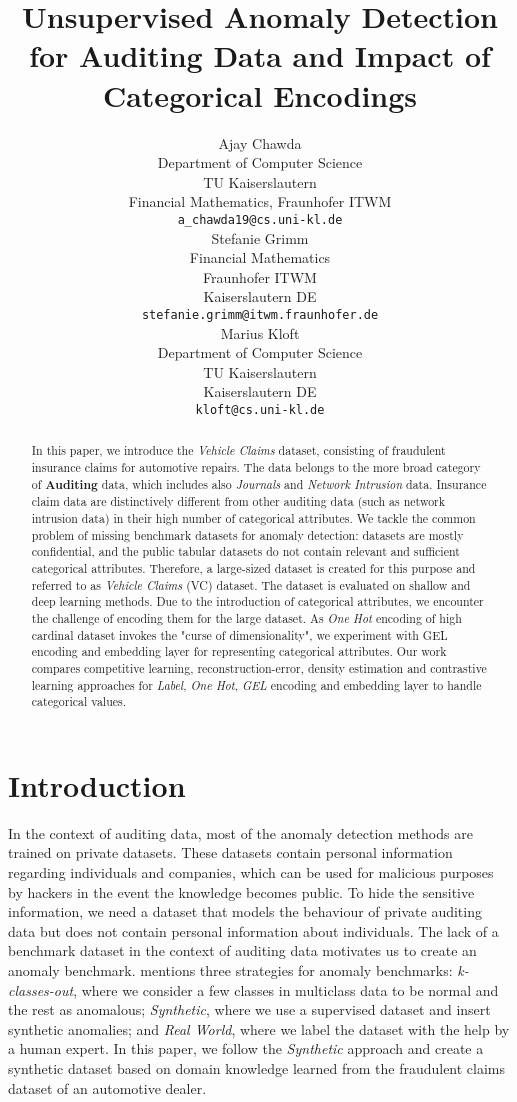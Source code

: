 \documentclass{article}
\title{Unsupervised Anomaly Detection for Auditing Data and Impact of Categorical Encodings}
\author{Ajay Chawda \\
Department of Computer Science\\
TU Kaiserslautern\\
Financial Mathematics, Fraunhofer ITWM \\
\texttt{a\_chawda19@cs.uni-kl.de} \\
\And
Stefanie Grimm\\
Financial Mathematics\\
Fraunhofer ITWM\\
Kaiserslautern DE\\
\texttt{stefanie.grimm@itwm.fraunhofer.de} \\
\AND
Marius Kloft \\
Department of Computer Science \\
TU Kaiserslautern \\
Kaiserslautern DE\\
\texttt{kloft@cs.uni-kl.de}
}
\begin{document}
\maketitle

\begin{abstract}
  In this paper, we introduce the \textit{Vehicle Claims} dataset, consisting of fraudulent insurance claims for automotive repairs. The data belongs to the more broad category of \textbf{Auditing} data, which includes also \textit{Journals} and \textit{Network Intrusion} data. Insurance claim data are distinctively different from other auditing data (such as network intrusion data) in their high number of categorical attributes. We tackle the common problem of missing benchmark datasets for anomaly detection: datasets are mostly confidential, and the public tabular datasets do not contain relevant and sufficient categorical attributes. Therefore, a large-sized dataset is created for this purpose and referred to as \textit{Vehicle Claims} (VC) dataset. The dataset is evaluated on shallow and deep learning methods. Due to the introduction of categorical attributes, we encounter the challenge of encoding them for the large dataset. As \textit{One Hot} encoding of high cardinal dataset invokes the "curse of dimensionality", we experiment with GEL encoding and embedding layer for representing categorical attributes. Our work compares competitive learning, reconstruction-error, density estimation and contrastive learning approaches for \textit{Label}, \textit{One Hot}, \textit{GEL} encoding and embedding layer to handle categorical values.
\end{abstract}

\section{Introduction}

In the context of auditing data, most of the anomaly detection methods are trained on private datasets. These datasets contain personal information regarding individuals and companies, which can be used for malicious purposes by hackers in the event the knowledge becomes public. To hide the sensitive information, we need a dataset that models the behaviour of private auditing data but does not contain personal information about individuals. The lack of a benchmark dataset in the context of auditing data motivates us to create an anomaly benchmark. \citep{ruff2021} mentions three strategies for anomaly benchmarks: \textit{k-classes-out}, where we consider a few classes in multiclass data to be normal and the rest as anomalous; \textit{Synthetic}, where we use a supervised dataset and insert synthetic anomalies; and \textit{Real World}, where we label the dataset with the help by a human expert. In this paper, we follow the \textit{Synthetic} approach and create a synthetic dataset based on domain knowledge learned from the fraudulent claims dataset of an automotive dealer.
\end{document}

